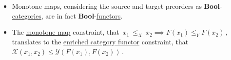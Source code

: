 \begin{itemize}
    \item  Monotone maps, considering the source and target preorders as \textbf{Bool}-\href{doc/1 math/Seven Sketches in Compositionality/Chapter 2: Resource theories/3 Enrichment/1 V-categories/1 V-category}{categories}, are in fact \textbf{Bool}-\href{doc/1 math/Seven Sketches in Compositionality/Chapter 2: Resource theories/4 Constructions on V-categories/2 Enriched functors/1 V-functor}{functors}.
    \item The \href{doc/1 math/Seven Sketches in Compositionality/Chapter 1: Generative Effects/4 Monotone maps/1 Monotone map}{monotone map} constraint, that \,$x_1\ \leq_X\ x_2 \implies F(x_1)\leq_Y F(x_2)$\,, translates to the \href{doc/1 math/Seven Sketches in Compositionality/Chapter 2: Resource theories/4 Constructions on V-categories/2 Enriched functors/1 V-functor}{enriched category functor} constraint, that \,$\mathcal{X}(x_1,x_2) \leq \mathcal{Y}(F(x_1),F(x_2))$\,.
  \end{itemize}
